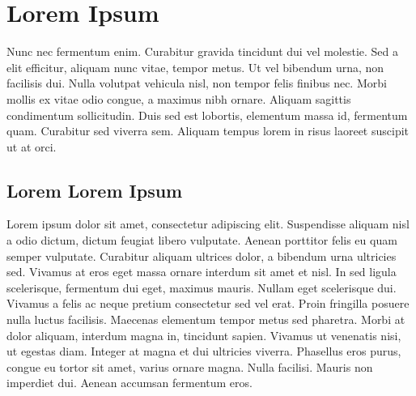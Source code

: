 \section{Lorem Ipsum}\label{loremipsum}
Nunc nec fermentum enim. Curabitur gravida tincidunt dui vel molestie. Sed a elit efficitur, aliquam nunc vitae, tempor metus. Ut vel bibendum urna, non facilisis dui. Nulla volutpat vehicula nisl, non tempor felis finibus nec. Morbi mollis ex vitae odio congue, a maximus nibh ornare. Aliquam sagittis condimentum sollicitudin. Duis sed est lobortis, elementum massa id, fermentum quam. Curabitur sed viverra sem. Aliquam tempus lorem in risus laoreet suscipit ut at orci.
\subsection{Lorem Lorem Ipsum}
Lorem ipsum dolor sit amet, consectetur adipiscing elit. Suspendisse aliquam nisl a odio dictum, dictum feugiat libero vulputate. Aenean porttitor felis eu quam semper vulputate. Curabitur aliquam ultrices dolor, a bibendum urna ultricies sed. Vivamus at eros eget massa ornare interdum sit amet et nisl. In sed ligula scelerisque, fermentum dui eget, maximus mauris. Nullam eget scelerisque dui. Vivamus a felis ac neque pretium consectetur sed vel erat. Proin fringilla posuere nulla luctus facilisis. Maecenas elementum tempor metus sed pharetra. Morbi at dolor aliquam, interdum magna in, tincidunt sapien. Vivamus ut venenatis nisi, ut egestas diam. Integer at magna et dui ultricies viverra. Phasellus eros purus, congue eu tortor sit amet, varius ornare magna. Nulla facilisi. Mauris non imperdiet dui. Aenean accumsan fermentum eros. \cite{example}


